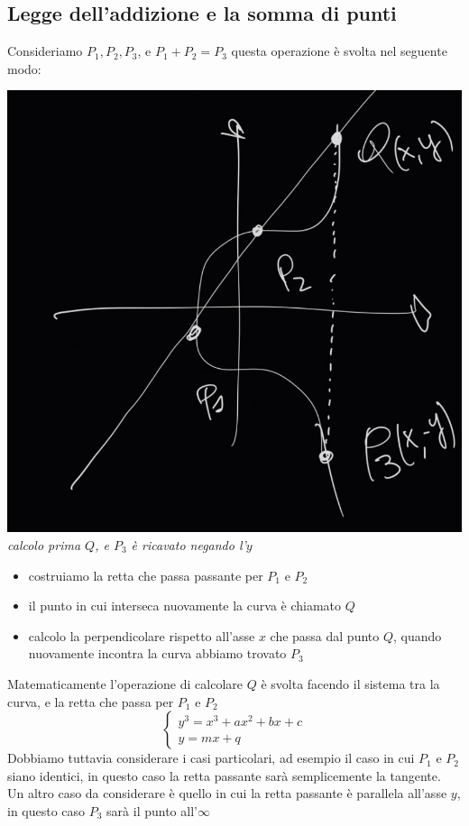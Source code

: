 \documentclass[11pt, oneside]{article}   	%
\begin{document}
\subsection*{Legge dell'addizione e la somma di punti}
Consideriamo $P_1, P_2, P_3$, e $P_1 + P_2 = P_3$ questa operazione è svolta nel seguente modo:
\begin{center}
\includegraphics[scale= 0.4]{curva}\\
\emph{calcolo prima $Q$, e $P_3$ è ricavato negando l'$y$}
\end{center}
\begin{itemize}
\item costruiamo la retta che passa passante per $P_1$ e $P_2$
\item il punto in cui interseca nuovamente la curva è chiamato $Q$
\item calcolo la perpendicolare rispetto all'asse $x$ che passa dal punto $Q$, quando nuovamente incontra la curva abbiamo trovato $P_3$
\end{itemize}
Matematicamente l'operazione di calcolare $Q$ è svolta facendo il sistema tra la curva, e la retta che passa per $P_1$ e $P_2$
\begin{equation}
    \begin{cases}
y^3 = x^3 + ax^2 + bx + c\\
y = mx + q
\end{cases}
\end{equation}
Dobbiamo tuttavia considerare i casi particolari, ad esempio il caso in cui $P_1$ e $P_2$ siano identici, in questo caso la retta passante sarà semplicemente la tangente. \\
Un altro caso da considerare è quello in cui la retta passante è parallela all'asse $y$, in questo caso $P_3$ sarà il punto all'$\infty$\\
\end{document}
